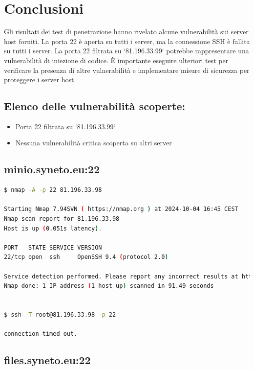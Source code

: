 \section{Conclusioni}

Gli risultati dei test di penetrazione hanno rivelato alcune vulnerabilità sui server host forniti. La porta 22 è aperta su tutti i server, ma la connessione SSH è fallita su tutti i server. La porta 22 filtrata su `81.196.33.99` potrebbe rappresentare una vulnerabilità di iniezione di codice. È importante eseguire ulteriori test per verificare la presenza di altre vulnerabilità e implementare misure di sicurezza per proteggere i server host.

\subsection{Elenco delle vulnerabilità scoperte:}
\begin{itemize}
\item Porta 22 filtrata su `81.196.33.99`
\item Nessuna vulnerabilità critica scoperta su altri server
\end{itemize}

\subsection*{minio.syneto.eu:22}

\begin{lstlisting}[language=bash,breaklines=true,postbreak=\mbox{\textcolor{red}{$\hookrightarrow$}\space}]
$ nmap -A -p 22 81.196.33.98

Starting Nmap 7.94SVN ( https://nmap.org ) at 2024-10-04 16:45 CEST
Nmap scan report for 81.196.33.98
Host is up (0.051s latency).

PORT   STATE SERVICE VERSION
22/tcp open  ssh     OpenSSH 9.4 (protocol 2.0)

Service detection performed. Please report any incorrect results at https://nmap.org/submit/ .
Nmap done: 1 IP address (1 host up) scanned in 91.49 seconds


$ ssh -T root@81.196.33.98 -p 22

connection timed out.\end{lstlisting}

\subsection*{files.syneto.eu:22}


